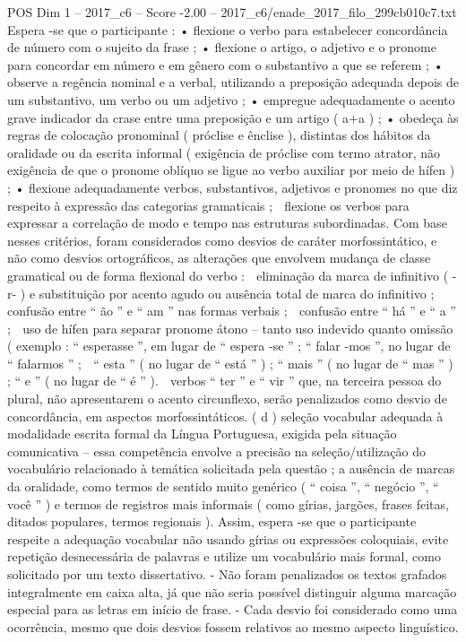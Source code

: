 \begin{textsample}{POS Dim 1 – 2017\_c6 – Score -2.00 – 2017\_c6/enade\_2017\_filo\_299cb010c7.txt}
Espera -se que o participante : • flexione o verbo para estabelecer concordância de número com o sujeito da frase ; • flexione o artigo, o adjetivo e o pronome para concordar em número e em gênero com o substantivo a que se referem ; • observe a regência nominal e a verbal, utilizando a preposição adequada depois de um substantivo, um verbo ou um adjetivo ; • empregue adequadamente o acento grave indicador da crase entre uma preposição e um artigo ( a+a ) ; • obedeça às regras de colocação pronominal ( próclise e ênclise ), distintas dos hábitos da oralidade ou da escrita informal ( exigência de próclise com termo atrator, não exigência de que o pronome oblíquo se ligue ao verbo auxiliar por meio de hífen ) ; • flexione adequadamente verbos, substantivos, adjetivos e pronomes no que diz respeito à expressão das categorias gramaticais ;  flexione os verbos para expressar a correlação de modo e tempo nas estruturas subordinadas.
Com base nesses critérios, foram considerados como desvios de caráter morfossintático, e não como desvios ortográficos, as alterações que envolvem mudança de classe gramatical ou de forma flexional do verbo :  eliminação da marca de infinitivo ( -r- ) e substituição por acento agudo ou ausência total de marca do infinitivo ;  confusão entre “ ão ” e “ am ” nas formas verbais ;  confusão entre “ há ” e “ a ” ;  uso de hífen para separar pronome átono – tanto uso indevido quanto omissão ( exemplo : “ esperasse ”, em lugar de “ espera -se ” ; “ falar -mos ”, no lugar de “ falarmos ” ;  “ esta ” ( no lugar de “ está ” ) ; “ mais ” ( no lugar de “ mas ” ) ; “ e ” ( no lugar de “ é ” ).  verbos “ ter ” e “ vir ” que, na terceira pessoa do plural, não apresentarem o acento circunflexo, serão penalizados como desvio de concordância, em aspectos morfossintáticos. ( d ) seleção vocabular adequada à modalidade escrita formal da Língua Portuguesa, exigida pela situação comunicativa – essa competência envolve a precisão na seleção/utilização do vocabulário relacionado à temática solicitada pela questão ; a ausência de marcas da oralidade, como termos de sentido muito genérico ( “ coisa ”, “ negócio ”, “ você ” ) e termos de registros mais informais ( como gírias, jargões, frases feitas, ditados populares, termos regionais ).
Assim, espera -se que o participante respeite a adequação vocabular não usando gírias ou expressões coloquiais, evite repetição desnecessária de palavras e utilize um vocabulário mais formal, como solicitado por um texto dissertativo. - Não foram penalizados os textos grafados integralmente em caixa alta, já que não seria possível distinguir alguma marcação especial para as letras em início de frase. - Cada desvio foi considerado como uma ocorrência, mesmo que dois desvios fossem relativos ao mesmo aspecto linguístico.

\end{textsample}

